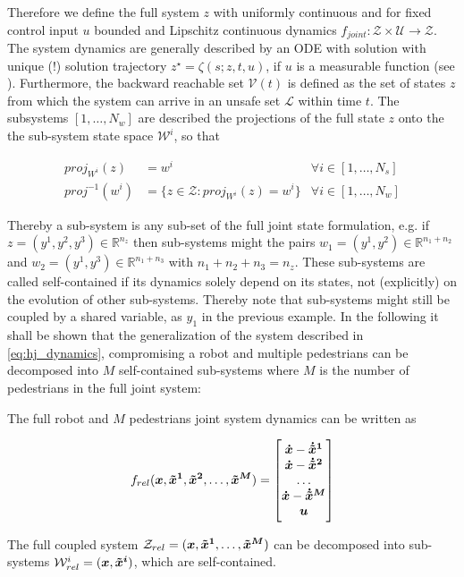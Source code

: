 Therefore we define the full system $z$ with uniformly continuous and for fixed control input $u$ bounded and Lipschitz continuous dynamics $f_{joint}: \mathcal{Z} \times \mathcal{U} \rightarrow \mathcal{Z}$. The system dynamics are generally described by an \ac{ODE} with solution with unique (!) solution trajectory $z^{\star} = \zeta(s; z, t, u)$, if $u$ is a measurable function (see \cite{Chen2016a}\cite{Varaiya1967}). Furthermore, the backward reachable set $\mathcal{V}(t)$ is defined as the set of states $z$ from which the system can arrive in an unsafe set $\mathcal{L}$ within time $t$. The subsystems $[1, \hdots, N_w]$ are described the projections of the full state $z$ onto the the sub-system state space $\mathcal{W}^i$, so that

\begin{align}
proj_{W^i}(z) &= w^i & \forall i \in [1, \hdots, N_s] \\
proj^{-1}(w^i) &= \{z \in \mathcal{Z}: proj_{W^i}(z) = w^i \} & \forall i \in [1, \hdots, N_w]
\label{eq:hj_projection}
\end{align}

Thereby a sub-system is any sub-set of the full joint state formulation, e.g. if $z = (y^1, y^2, y^3) \in \mathbb{R}^{n_z}$ then sub-systems might the pairs $w_1 = (y^1, y^2) \in \mathbb{R}^{n_1 + n_2}$ and $w_2 = (y^1, y^3) \in \mathbb{R}^{n_1 + n_3}$ with $n_1 + n_2 + n_3 = n_z$. These sub-systems are called self-contained if its dynamics solely depend on its states, not (explicitly) on the evolution of other sub-systems. Thereby note that sub-systems might still be coupled by a shared variable, as $y_1$ in the previous example.
\newline
In the following it shall be shown that the generalization of the system described in \ref{eq:hj_dynamics}, compromising a robot and multiple pedestrians can be decomposed into $M$ self-contained sub-systems where $M$ is the number of pedestrians in the full joint system: \\

\begin{corollary}
The full robot and $M$ pedestrians joint system dynamics can be written as 

\begin{equation}
\frel(\x, \xped[1], \xped[2], \hdots, \xped[M]) = 
\begin{bmatrix} 
\dx - \dxped[1] \\ 
\dx - \dxped[2] \\ 
\hdots \\
\dx - \dxped[M] \\ 
\u
\end{bmatrix}
\label{eq:hj_dynamics_full}
\end{equation}

The full coupled system $\mathcal{Z}_{rel} = (\x, \xped[1], \hdots, \xped[M])$ can be decomposed into sub-systems $\mathcal{W}_{rel}^i = (\x, \xped[i])$, which are self-contained. 
\label{co:hj_sub_systems}
\end{corollary}

